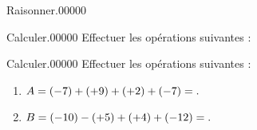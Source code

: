 \documentclass[a4paper,dvipsnames,french,10pt]{book}
\begin{document}
\begin{pageParcoursu}
\begin{ExoCuN}{Raisonner.}{0}{0}{0}{0}{0}
\begin{enumerate}
\end{enumerate}
\end{ExoCuN}

\begin{ExoCuN}{Calculer.}{0}{0}{0}{0}{0}
Effectuer les opérations suivantes :\vspace{.2cm}


\end{ExoCuN}

\begin{ExoCuN}{Calculer.}{0}{0}{0}{0}{0}
Effectuer les opérations suivantes :\vspace{.2cm}
\begin{enumerate}
\item $A=(-7)+(+9)+(+2)+(-7)=.\dotfill$\vspace{.2cm}
\item $B=(-10)-(+5)+(+4)+(-12)=.\dotfill$
\end{enumerate}
\end{ExoCuN}




\end{pageParcoursu}
\end{document}
